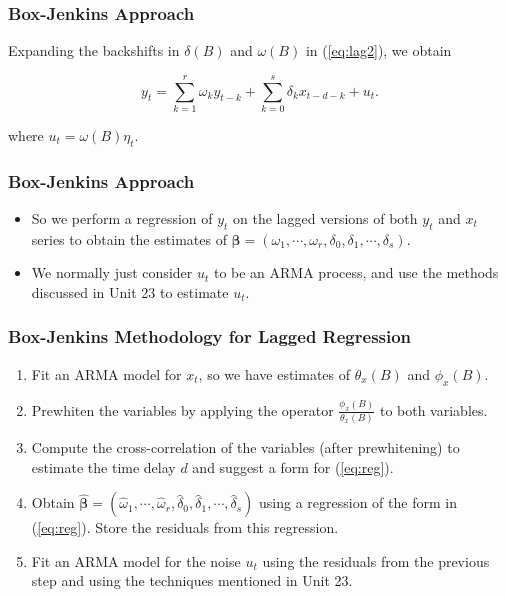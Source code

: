 \documentclass[%
xcolor=pdftex]{beamer}
\begin{document}
\begin{frame}
\frametitle{Box-Jenkins Approach}

Expanding the backshifts in $\delta(B)$ and $\omega(B)$ in (\ref{eq:lag2}), we obtain

\begin{equation} \label{eq:reg}
y_t = \sum_{k=1}^r \omega_k y_{t-k} + \sum_{k=0}^s \delta_k x_{t-d-k} + u_t.
\end{equation}

where $u_t = \omega(B)\eta_t$.\\

\end{frame}

\begin{frame}
\frametitle{Box-Jenkins Approach}

\begin{itemize}
\item So we perform a regression of $y_t$ on the lagged versions of both $y_t$ and $x_t$ series to obtain the estimates of $\boldsymbol{\beta} = (\omega_1, \cdots, \omega_r, \delta_0, \delta_1, \cdots, \delta_s)$.
\item We normally just consider $u_t$ to be an ARMA process, and use the methods discussed in Unit 23 to estimate $u_t$.
\end{itemize}

\end{frame}


\begin{frame}
\frametitle{Box-Jenkins Methodology for Lagged Regression}

\begin{enumerate}

\item Fit an ARMA model for $x_t$, so we have estimates of $\theta_x(B)$ and $\phi_x(B)$.
\item Prewhiten the variables by applying the operator $\frac{\phi_x(B)}{\theta_x(B)}$ to both variables.
\item Compute the cross-correlation of the variables (after prewhitening) to estimate the time delay $d$ and suggest a form for (\ref{eq:reg}).
\item Obtain $\boldsymbol{\hat{\beta}} = (\hat{\omega}_1, \cdots, \hat{\omega}_r, \hat{\delta}_0, \hat{\delta}_1, \cdots, \hat{\delta}_s)$ using a regression of the form in (\ref{eq:reg}). Store the residuals from this regression.
\item Fit an ARMA model for the noise $u_t$ using the residuals from the previous step and using the techniques mentioned in Unit 23. 

\end{enumerate}

\end{frame}
\end{document}
